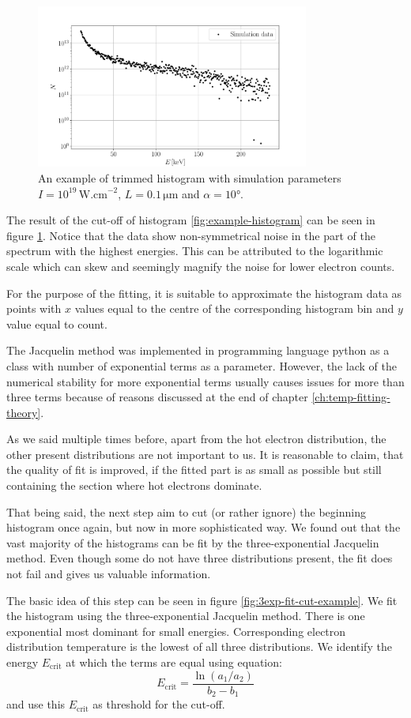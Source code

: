 \begin{figure}[h]
	\centering
	\includegraphics[width=0.8\textwidth]{figures/trimmed-hist}
	\caption{An example of trimmed histogram with simulation parameters $I=10^{19}\,\mathrm{W.cm}^{-2}$, $L=0.1\,\mathrm{\mu m}$ and $\alpha = 10$°.}
	\label{fig:trimmed-hist}
\end{figure}

The result of the cut-off of histogram \ref{fig:example-histogram} can be seen in figure \ref{fig:trimmed-hist}. Notice that the data show non-symmetrical noise in the part of the spectrum with the highest energies. This can be attributed to the logarithmic scale which can skew and seemingly magnify the noise for lower electron counts. 

For the purpose of the fitting, it is suitable to approximate the histogram data as points with $x$ values equal to the centre of the corresponding histogram bin and $y$ value equal to count.

The Jacquelin method was implemented in programming language python as a class with number of exponential terms as a parameter. However, the lack of the numerical stability for more exponential terms usually causes issues for more than three terms because of reasons discussed at the end of chapter \ref{ch:temp-fitting-theory}.

As we said multiple times before, apart from the hot electron distribution, the other present distributions are not important to us. It is reasonable to claim, that the quality of fit is improved, if the fitted part is as small as possible but still containing the section where hot electrons dominate.

That being said, the next step aim to cut (or rather ignore) the beginning histogram once again, but now in more sophisticated way. We found out that the vast majority of the histograms can be fit by the three-exponential Jacquelin method. Even though some do not have three distributions present, the fit does not fail and gives us valuable information.

The basic idea of this step can be seen in figure \ref{fig:3exp-fit-cut-example}. We fit the histogram using the three-exponential Jacquelin method. There is one exponential most dominant for small energies. Corresponding electron distribution temperature is the lowest of all three distributions. We identify the energy $E_{\mathrm{crit}}$ at which the terms are equal using equation:
\begin{equation}
	E_{\mathrm{crit}} = \frac{\ln{\left(a_1/a_2\right)}}{b_2-b_1}
\end{equation}
and use this $E_{\mathrm{crit}}$ as threshold for the cut-off.